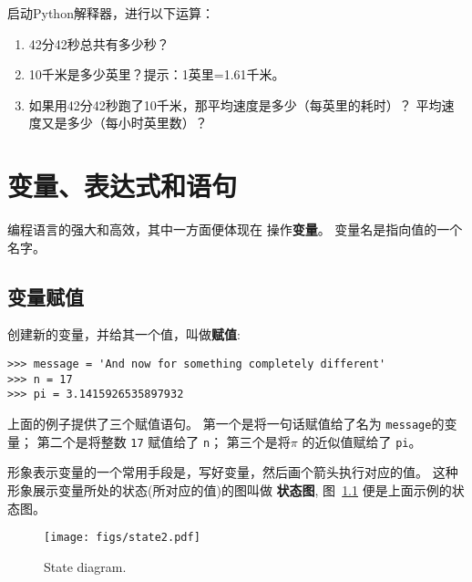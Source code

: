 \documentclass[10pt]{book}
\begin{document}
\begin{exercise}

启动Python解释器，进行以下运算：

\begin{enumerate}

\item 42分42秒总共有多少秒？

\item 10千米是多少英里？提示：1英里=1.61千米。

\item 如果用42分42秒跑了10千米，那平均速度是多少（每英里的耗时）？
平均速度又是多少（每小时英里数）？


\end{enumerate}

\end{exercise}


\chapter{变量、表达式和语句}

编程语言的强大和高效，其中一方面便体现在 操作{\bf 变量}。
变量名是指向值的一个名字。


\section{变量赋值}
\label{variables}

创建新的变量，并给其一个值，叫做{\bf 赋值}: 

\begin{verbatim}
>>> message = 'And now for something completely different'
>>> n = 17
>>> pi = 3.1415926535897932
\end{verbatim}
%
上面的例子提供了三个赋值语句。
第一个是将一句话赋值给了名为 {\tt message}的变量；
第二个是将整数  {\tt 17} 赋值给了 {\tt n}；
第三个是将$\pi$  的近似值赋给了  {\tt pi}。

形象表示变量的一个常用手段是，写好变量，然后画个箭头执行对应的值。
这种形象展示变量所处的状态(所对应的值)的图叫做 {\bf 状态图}, 
图~\ref{fig.state2} 便是上面示例的状态图。

\begin{figure}
\centerline
{\texttt{[image: figs/state2.pdf]}}
\caption{State diagram.}
\label{fig.state2}
\end{figure}
\end{document}
